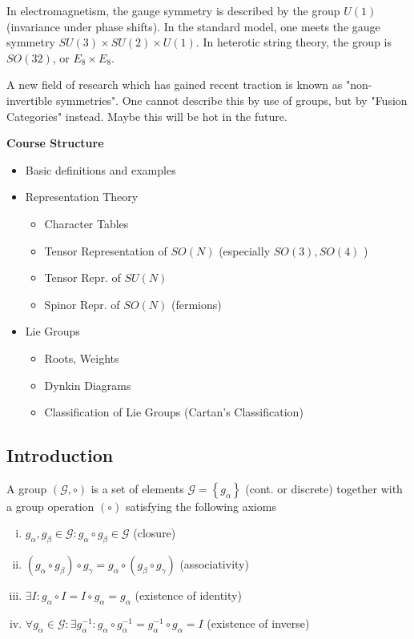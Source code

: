 In electromagnetism, the gauge symmetry is described by the group \(U(1)\) (invariance under phase shifts). In the standard model, one meets the gauge symmetry \(SU(3) \times SU(2) \times U(1)\). In heterotic string theory, the group is \(SO(32)\), or \(E_8 \times E_8\).

A new field of research which has gained recent traction is known as "non-invertible symmetries". One cannot describe this by use of groups, but by "Fusion Categories" instead. Maybe this will be hot in the future. 

\newpage
\Large{\textbf{Course Structure}}
\normalsize
\begin{itemize}
    \item Basic definitions and examples
    \item Representation Theory \begin{itemize}
        \item Character Tables
        \item Tensor Representation of \(SO(N)\) (especially \(SO(3), SO(4)\) )
        \item Tensor Repr. of \(SU(N)\)
        \item Spinor Repr. of \(SO(N)\) (fermions) 
    \end{itemize}
    \item Lie Groups \begin{itemize}
        \item Roots, Weights
        \item Dynkin Diagrams
        \item Classification of Lie Groups (Cartan's Classification)
    \end{itemize}
\end{itemize}
\newpage
\subsection{Introduction}
\begin{definition}
    A group \(\left( \mathcal{G} , \circ \right) \)  is a set of elements \(\mathcal{G} = \left\{ g_{\alpha }  \right\} \) (cont. or discrete) together with a group operation \(( \circ)\) satisfying the following axioms \begin{enumerate}[i)]
        \item \(g_{\alpha }, g_{\beta } \in \mathcal{G}   : g_{\alpha } \circ g_{\beta } \in \mathcal{G}   \) (closure)
        \item \(\left( g_{\alpha } \circ g_{\beta }   \right) \circ g_{\gamma } = g_{\alpha } \circ  \left( g_{\beta } \circ g_{\gamma }   \right)   \) (associativity)
        \item \(\exists I: g_{\alpha } \circ  I = I \circ  g_{\alpha } = g_{\alpha }   \) (existence of identity)
        \item \(\forall g_{\alpha } \in \mathcal{G}  : \exists g_{\alpha } ^{-1} : g_{\alpha } \circ  g_{\alpha } ^{-1} = g_{\alpha } ^{-1} \circ g_{\alpha } = I  \) (existence of inverse)
    \end{enumerate} 
\end{definition}

